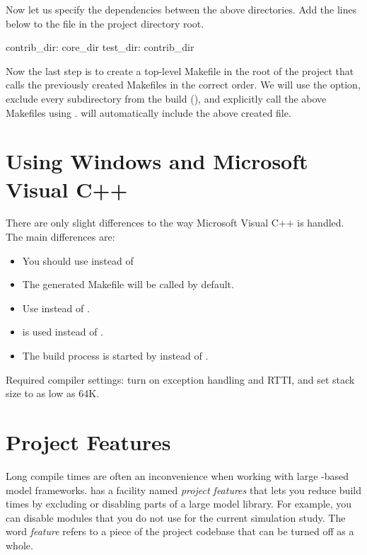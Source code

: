Now let us specify the dependencies between the above directories.
Add the lines below to the  file in the project directory root.

\begin{filelisting}
contrib_dir: core_dir
test_dir: contrib_dir
\end{filelisting}

Now the last step is to create a top-level Makefile in the root of the project that
calls the previously created Makefiles in the correct order. We will use the
 option, exclude every subdirectory from the build (), and explicitly call
the above Makefiles using .  will automatically include
the above created  file.



\ifcommercial
\section{Using Windows and Microsoft Visual C++}
\label{sec:build-sim-progs:using-microsoft-visual-c}

There are only slight differences to the way Microsoft Visual C++
is handled. The main differences are:
\begin{itemize}
  \item{You should use  instead of }
  \item{The generated Makefile will be called  by default.}
  \item{Use  instead of .}
  \item{ is used instead of .}
  \item{The build process is started by  instead of .}
\end{itemize}

Required compiler settings: turn on exception handling and RTTI, and
set stack size to as low as 64K.
\fi

\section{Project Features}
\label{sec:build-sim-progs:project-features}

Long compile times are often an inconvenience when working with large
{\opp}-based model frameworks. {\opp} has a facility named \textit{project
features} that lets you reduce build times by excluding or disabling parts
of a large model library. For example, you can disable modules that you do
not use for the current simulation study. The word \textit{feature} refers
to a piece of the project codebase that can be turned off as a whole.

